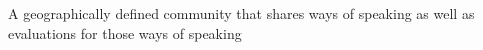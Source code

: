 A geographically defined community that shares ways of speaking as well as evaluations for those ways of speaking

